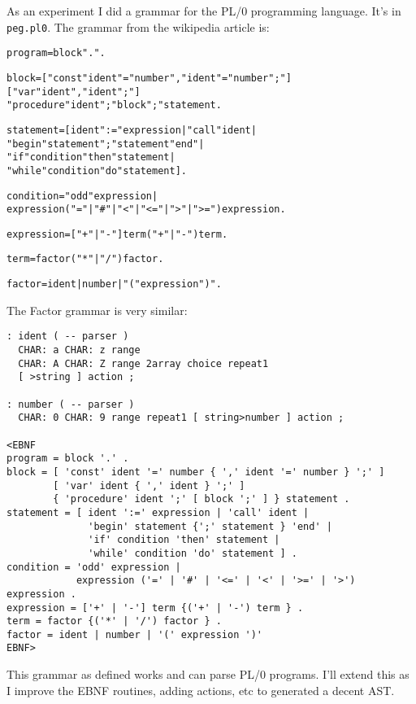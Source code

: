 As an experiment I did a grammar for the PL/0 programming
language. It's in \texttt{peg.pl0}. The grammar from the wikipedia article
is:
\begin{alltt}
program = block "." .

block = [ "const" ident "=" number {"," ident "=" number} ";"]
        [ "var" ident {"," ident} ";"]
        { "procedure" ident ";" block ";" } statement .

statement = [ ident ":=" expression | "call" ident |
            "begin" statement {";" statement } "end" |
            "if" condition "then" statement |
            "while" condition "do" statement ].

condition = "odd" expression |
            expression ("="|"#"|"<"|"<="|">"|">=") expression .

expression = [ "+"|"-"] term { ("+"|"-") term}.

term = factor {("*"|"/") factor}.

factor = ident | number | "(" expression ")".
\end{alltt}
The Factor grammar is very similar:
\begin{verbatim}
: ident ( -- parser )
  CHAR: a CHAR: z range 
  CHAR: A CHAR: Z range 2array choice repeat1 
  [ >string ] action ;

: number ( -- parser )
  CHAR: 0 CHAR: 9 range repeat1 [ string>number ] action ;

<EBNF
program = block '.' .
block = [ 'const' ident '=' number { ',' ident '=' number } ';' ]
        [ 'var' ident { ',' ident } ';' ]
        { 'procedure' ident ';' [ block ';' ] } statement .
statement = [ ident ':=' expression | 'call' ident |
              'begin' statement {';' statement } 'end' |
              'if' condition 'then' statement |
              'while' condition 'do' statement ] .
condition = 'odd' expression |
            expression ('=' | '#' | '<=' | '<' | '>=' | '>') expression .
expression = ['+' | '-'] term {('+' | '-') term } .
term = factor {('*' | '/') factor } .
factor = ident | number | '(' expression ')'
EBNF>
\end{verbatim}
This grammar as defined works and can parse PL/0 programs. I'll extend
this as I improve the EBNF routines, adding actions, etc to generated
a decent AST.
